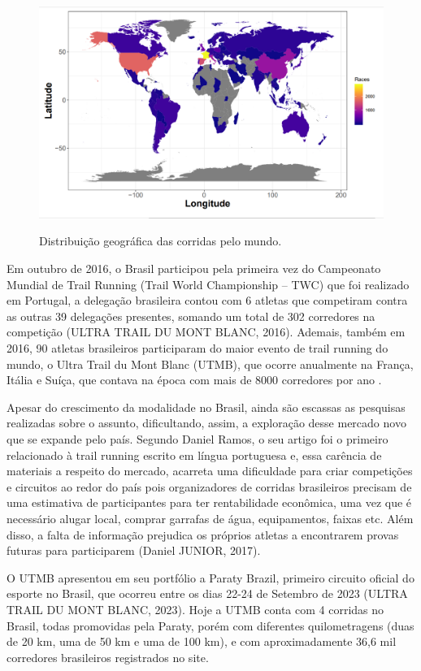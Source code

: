 \begin{figure}
    \centering
    \caption{Distribuição geográfica das corridas pelo mundo.}
    \includegraphics[width = 0.9\linewidth]{relatorios/paraty/figuras/image3.png}
    \label{fig:imagem1}
\end{figure}

 Em outubro de 2016, o Brasil participou pela primeira vez do Campeonato Mundial de Trail Running (Trail World Championship – TWC) que foi realizado em Portugal, a delegação brasileira contou com 6 atletas que competiram contra as outras 39 delegações presentes, somando um total de 302 corredores na competição (ULTRA TRAIL DU MONT BLANC, 2016). Ademais, também em 2016, 90 atletas brasileiros participaram do maior evento de trail running do mundo, o Ultra Trail du Mont Blanc (UTMB), que ocorre anualmente na França, Itália e Suíça, que contava na época com mais de 8000 corredores por ano \cite{oliveira2017}.

Apesar do crescimento da modalidade no Brasil, ainda são escassas as pesquisas realizadas sobre o assunto, dificultando, assim, a exploração desse mercado novo que se expande pelo país. Segundo Daniel Ramos, o seu artigo foi o primeiro relacionado à trail running escrito em língua portuguesa e, essa carência de materiais a respeito do mercado, acarreta uma dificuldade para criar competições e circuitos ao redor do país pois organizadores de corridas brasileiros precisam de uma estimativa de participantes para ter rentabilidade econômica, uma vez que é necessário alugar local, comprar garrafas de água, equipamentos, faixas etc. Além disso, a falta de informação prejudica os próprios atletas a encontrarem provas futuras para participarem (Daniel JUNIOR, 2017).

O UTMB apresentou em seu portfólio a Paraty Brazil, primeiro circuito oficial do esporte no Brasil, que ocorreu entre os dias 22-24 de Setembro de 2023 (ULTRA TRAIL DU MONT BLANC, 2023). Hoje a UTMB conta com 4 corridas no Brasil, todas promovidas pela Paraty, porém com diferentes quilometragens (duas de 20 km, uma de 50 km e uma de 100 km), e com aproximadamente 36,6 mil corredores brasileiros registrados no site. 

